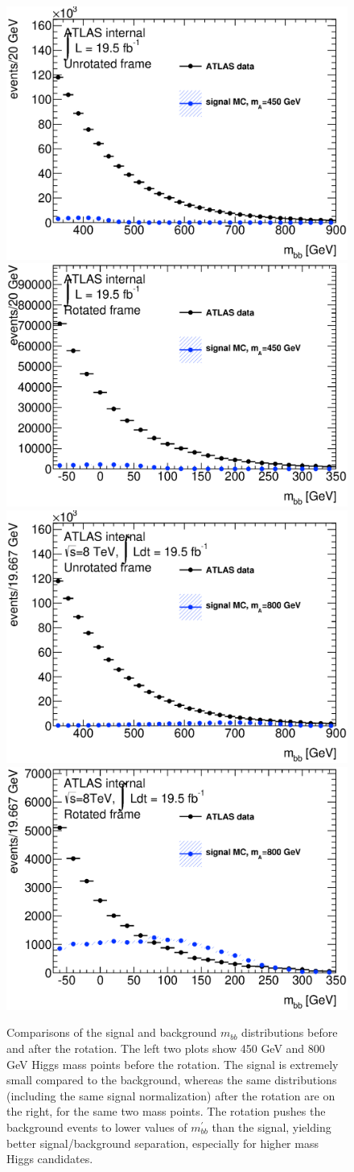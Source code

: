 \begin{figure}[hbt]
\includegraphics[width=0.45\linewidth]{SignalKin/h_mass_bAbb_450_unrotated.eps}
\includegraphics[width=0.45\linewidth]{SignalKin/h_mass_bAbb_450_rotated.eps} \\
\includegraphics[width=0.45\linewidth]{SignalKin/h_mass_bAbb_800_unrotated.eps}
\includegraphics[width=0.45\linewidth]{SignalKin/h_mass_bAbb_800_rotated.eps} \\
\caption{ Comparisons of the signal and background $m_{bb}$ distributions
    before and after the rotation.  The left two plots show 450 GeV and 800 GeV
    Higgs mass points before the rotation. The signal is extremely small compared to the background, whereas the 
    same distributions (including the same signal normalization) after the rotation
    are on the right, for the same two mass points.  The rotation pushes the
    background events to lower values of $m_{bb}^{'}$ than the signal, yielding
    better signal/background separation, especially for higher mass Higgs candidates.
     \label{fig:transformed_vars}}
\end{figure}


